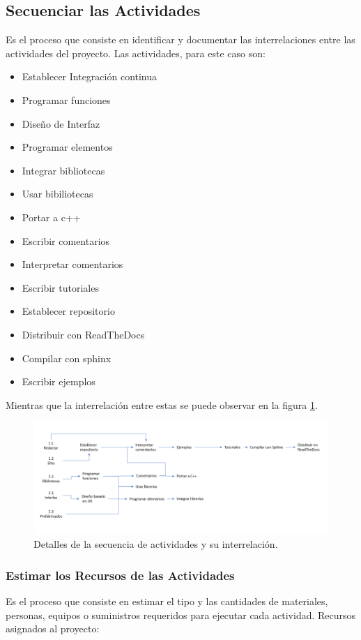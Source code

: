 \documentclass[]{article}
\begin{document}
\subsection{Secuenciar las Actividades}
Es el proceso que consiste en identificar y documentar las interrelaciones entre las actividades del proyecto.
Las actividades, para este caso son: 
\begin{itemize}
\item Establecer Integraci\'on continua
\item	Programar funciones
\item	Dise\~no de Interfaz
\item	Programar elementos
\item	Integrar bibliotecas
\item	Usar bibiliotecas
\item	Portar a c++
\item	Escribir comentarios
\item	Interpretar comentarios
\item	Escribir tutoriales
\item	Establecer repositorio
\item	Distribuir con ReadTheDocs
\item	Compilar con sphinx
\item	Escribir ejemplos
\end{itemize}
Mientras que la interrelaci\'on entre estas se puede observar en la figura \ref{EEDDTT}.
\begin{figure} [H]
	\centering
	\includegraphics[width=1\textwidth]{EDT2}
	\caption{Detalles de la secuencia de actividades y su interrelaci\'on.} 
	\label{EEDDTT}
\end{figure}
\subsubsection{Estimar los Recursos de las Actividades} Es el proceso que consiste en estimar el
tipo y las cantidades de materiales, personas, equipos o suministros requeridos para
ejecutar cada actividad.
Recursos asignados al proyecto:
\end{document}
